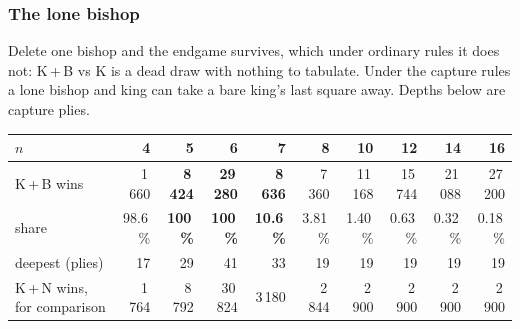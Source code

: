 \documentclass[10pt]{article}
\begin{document}
\medskip
{}

\subsubsection{The lone bishop}\label{sub:kbbk-lone}

\noindent
Delete one bishop and the endgame survives, which under ordinary rules it does
not: K\,+\,B vs K is a dead draw with nothing to tabulate. Under the capture
rules a lone bishop and king can take a bare king's last square away. Depths
below are capture plies.

\begin{center}\footnotesize
\begin{tabular}{@{}lrrrrrrrrr@{}}
\toprule
$n$ & 4 & \textbf{5} & \textbf{6} & \textbf{7} & 8 & 10 & 12 & 14 & 16\\
\midrule
K\,+\,B wins            & 1\,660 & \textbf{8\,424} & \textbf{29\,280} &
  \textbf{8\,636} & 7\,360 & 11\,168 & 15\,744 & 21\,088 & 27\,200\\
share                   & 98.6\,\% & \textbf{100\,\%} & \textbf{100\,\%} &
  \textbf{10.6\,\%} & 3.81\,\% & 1.40\,\% & 0.63\,\% & 0.32\,\% & 0.18\,\%\\
deepest (plies)         & 17 & 29 & 41 & 33 & 19 & 19 & 19 & 19 & 19\\
K\,+\,N wins, for comparison & 1\,764 & 8\,792 & 30\,824 & 3\,180 & 2\,844 &
  2\,900 & 2\,900 & 2\,900 & 2\,900\\
\bottomrule
\end{tabular}
\end{center}
\end{document}
